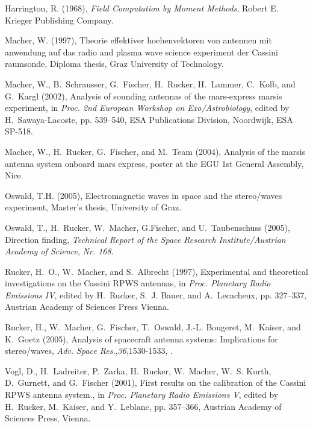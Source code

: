 \documentclass[galley,ras]{agu2001}
\begin{document}
\begin{article}
\begin{thebibliography}{}
Harrington, R. (1968), \textit{Field Computation by Moment Methods}, Robert E.
  Krieger Publishing Company.

 Macher, W. (1997), Theorie effektiver hoehenvektoren von antennen mit anwendung  auf das radio and plasma wave science experiment der Cassini raumsonde,  Diploma thesis, Graz University of Technology.

 Macher, W., B.~Schrausser, G.~Fischer, H.~Rucker, H.~Lammer, C.~Kolb, and  G.~Kargl (2002), Analysis of sounding antennas of the mars-express marsis  experiment, in \textit{Proc. 2nd European Workshop on Exo/Astrobiology},  edited by H.~Sawaya-Lacoste, pp. 539--540, ESA Publications Division,  Noordwijk, ESA SP-518.

 Macher, W., H.~Rucker, G.~Fischer, and M.~Team (2004), Analysis of the marsis  antenna system onboard mars express, poster at the EGU 1st General Assembly,  Nice.

Oswald, T.H. (2005), Electromagnetic waves in space and the stereo/waves
  experiment, Master's thesis, University of Graz.


 Oswald, T., H.~Rucker, W.~Macher, G.Fischer, and U.~Taubenschuss  (2005{}), Direction finding, \textit{Technical Report of the  Space Research Institute/Austrian Academy of Science}, \textit{Nr. 168}.

 Rucker, H.~O., W.~Macher, and S.~Albrecht (1997), Experimental and theoretical  investigations on the Cassini RPWS antennas, in \textit{Proc. Planetary Radio  Emissions IV}, edited by H.~Rucker, S.~J. Bauer, and A.~Lecacheux, pp.  327--337, Austrian Academy of Sciences Press Vienna.

 Rucker, H., W.~Macher, G.~Fischer, T.~Oswald, J.-L. Bougeret, M.~Kaiser, and  K.~Goetz (2005), Analysis of spacecraft antenna systems: Implications for  stereo/waves, \textit{Adv. Space Res.},\textit{36},1530-1533, .



 Vogl, D., H.~Ladreiter, P.~Zarka, H.~Rucker, W.~Macher, W.~S. Kurth,  D.~Gurnett, and G.~Fischer (2001), First results on the calibration of the  Cassini RPWS antenna system., in \textit{Proc. Planetary Radio Emissions V},  edited by H.~Rucker, M.~Kaiser, and Y.~Leblanc, pp. 357--366, Austrian  Academy of Sciences Press, Vienna.


\end{thebibliography}
\end{article}
\end{document}
